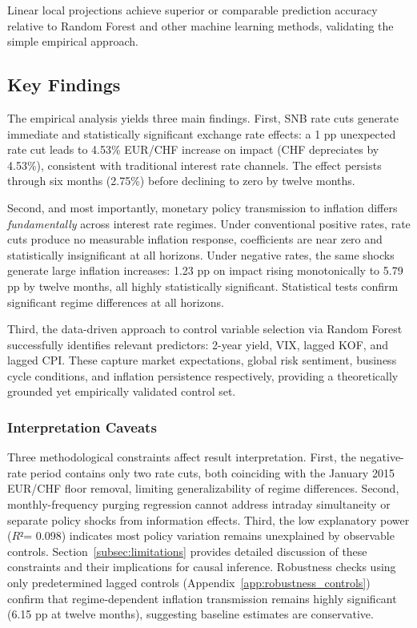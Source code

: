 \documentclass[12pt,a4paper]{article}
\begin{document}
Linear local projections achieve superior or comparable prediction accuracy relative to Random Forest and other machine learning methods, validating the simple empirical approach.
\newpage
\subsection{Key Findings}
\label{subsec:key_findings}
The empirical analysis yields three main findings. First, SNB rate cuts generate immediate and statistically significant exchange rate effects: a 1 pp unexpected rate cut leads to 4.53\% EUR/CHF increase on impact (CHF depreciates by 4.53\%), consistent with traditional interest rate channels. The effect persists through six months (2.75\%) before declining to zero by twelve months.

Second, and most importantly, monetary policy transmission to inflation differs \textit{fundamentally} across interest rate regimes. Under conventional positive rates, rate cuts produce no measurable inflation response, coefficients are near zero and statistically insignificant at all horizons. Under negative rates, the same shocks generate large inflation increases: 1.23 pp on impact rising monotonically to 5.79 pp by twelve months, all highly statistically significant. Statistical tests confirm significant regime differences at all horizons.

Third, the data-driven approach to control variable selection via Random Forest successfully identifies relevant predictors: 2-year yield, VIX, lagged KOF, and lagged CPI. These capture market expectations, global risk sentiment, business cycle conditions, and inflation persistence respectively, providing a theoretically grounded yet empirically validated control set.

\subsubsection{Interpretation Caveats}

Three methodological constraints affect result interpretation. First, the negative-rate period contains only two rate cuts, both coinciding with the January 2015 EUR/CHF floor removal, limiting generalizability of regime differences. Second, monthly-frequency purging regression cannot address intraday simultaneity or separate policy shocks from information effects. Third, the low explanatory power ($R²$= 0.098) indicates most policy variation remains unexplained by observable controls. Section~\ref{subsec:limitations} provides detailed discussion of these constraints and their implications for causal inference. Robustness checks using only predetermined lagged controls (Appendix~\ref{app:robustness_controls}) confirm that regime-dependent inflation transmission remains highly significant (6.15 pp at twelve months), suggesting baseline estimates are conservative.
\end{document}
